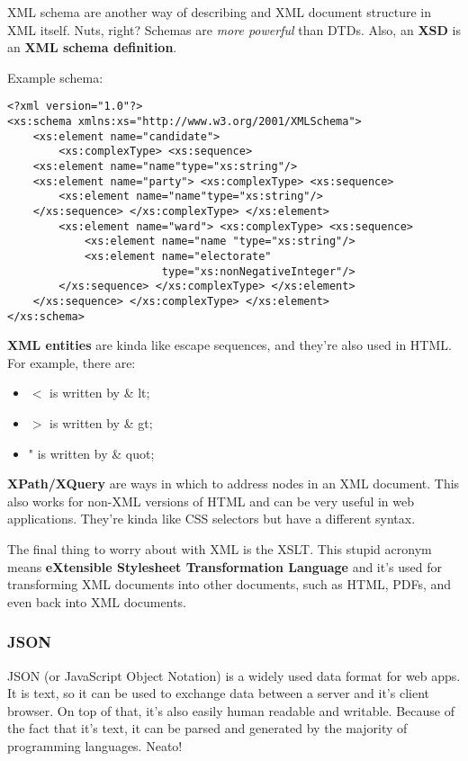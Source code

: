 \documentclass[11pt,a4paper,titlepage,dvipsnames,cmyk]{scrartcl}
\begin{document}
XML schema are another way of describing and XML document structure in XML
itself. Nuts, right? Schemas are \textit{more powerful} than DTDs. Also,
an \textbf{XSD} is an \textbf{XML schema definition}.

Example schema:
\begin{lstlisting}[style=B]
<?xml version="1.0"?>
<xs:schema xmlns:xs="http://www.w3.org/2001/XMLSchema">
    <xs:element name="candidate">
        <xs:complexType> <xs:sequence>
    <xs:element name="name"type="xs:string"/>
    <xs:element name="party"> <xs:complexType> <xs:sequence>
        <xs:element name="name"type="xs:string"/>
    </xs:sequence> </xs:complexType> </xs:element>
        <xs:element name="ward"> <xs:complexType> <xs:sequence>
            <xs:element name="name "type="xs:string"/>
            <xs:element name="electorate"
                        type="xs:nonNegativeInteger"/>
        </xs:sequence> </xs:complexType> </xs:element>
    </xs:sequence> </xs:complexType> </xs:element>
</xs:schema>
\end{lstlisting}

\textbf{XML entities} are kinda like escape sequences, and they're also
used in HTML. For example, there are:
\begin{itemize}
    \item $<$ is written by \& lt;
    \item $>$ is written by \& gt;
    \item " is written by \& quot;
\end{itemize}

\textbf{XPath/XQuery} are ways in which to address nodes in an XML
document. This also works for non-XML versions of HTML and can be very
useful in web applications. They're kinda like CSS selectors but have a
different syntax.

The final thing to worry about with XML is the XSLT. This stupid acronym
means \textbf{eXtensible Stylesheet Transformation Language} and it's used
for transforming XML documents into other documents, such as HTML, PDFs,
and even back into XML documents.

\subsubsection{JSON}%
\label{ssub:JSON}
JSON (or JavaScript Object Notation) is a widely used data format for web
apps. It is text, so it can be used to exchange data between a server and
it's client browser. On top of that, it's also easily human readable and
writable. Because of the fact that it's text, it can be parsed and
generated by the majority of programming languages. Neato!
\end{document}
